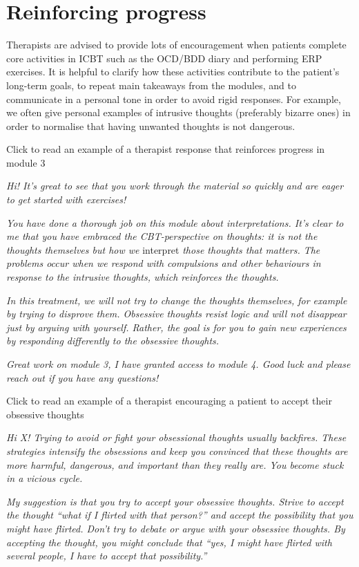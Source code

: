 \documentclass[]{book}
\theoremstyle{definition}
\theoremstyle{definition}
\theoremstyle{definition}
\theoremstyle{remark}
\begin{document}
\hypertarget{reinforcing-progress}{%
\section{Reinforcing progress}\label{reinforcing-progress}}

Therapists are advised to provide lots of encouragement when patients
complete core activities in ICBT such as the OCD/BDD diary and
performing ERP exercises. It is helpful to clarify how these activities
contribute to the patient's long-term goals, to repeat main takeaways
from the modules, and to communicate in a personal tone in order to
avoid rigid responses. For example, we often give personal examples of
intrusive thoughts (preferably bizarre ones) in order to normalise that
having unwanted thoughts is not dangerous.

 Click to read an example of a therapist response that reinforces
progress in module 3

\emph{Hi! It's great to see that you work through the material so
quickly and are eager to get started with exercises!}

\emph{You have done a thorough job on this module about interpretations.
It's clear to me that you have embraced the CBT-perspective on thoughts:
it is not the thoughts themselves but how we} interpret \emph{those
thoughts that matters. The problems occur when we respond with
compulsions and other behaviours in response to the intrusive thoughts,
which reinforces the thoughts.}

\emph{In this treatment, we will not try to change the thoughts
themselves, for example by trying to disprove them. Obsessive thoughts
resist logic and will not disappear just by arguing with yourself.
Rather, the goal is for you to gain new experiences by responding
differently to the obsessive thoughts.}

\emph{Great work on module 3, I have granted access to module 4. Good
luck and please reach out if you have any questions!}

 Click to read an example of a therapist encouraging a patient to accept
their obsessive thoughts

\emph{Hi X! Trying to avoid or fight your obsessional thoughts usually
backfires. These strategies intensify the obsessions and keep you
convinced that these thoughts are more harmful, dangerous, and important
than they really are. You become stuck in a vicious cycle.}

\emph{My suggestion is that you try to accept your obsessive thoughts.
Strive to accept the thought ``what if I flirted with that person?'' and
accept the possibility that you might have flirted. Don't try to debate
or argue with your obsessive thoughts. By accepting the thought, you
might conclude that ``yes, I might have flirted with several people, I
have to accept that possibility.''}
\end{document}
